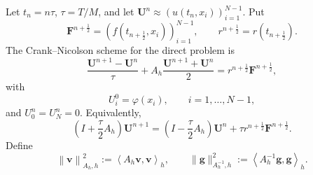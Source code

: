 \documentclass[reqno]{amsart}
\newcommand{\Ah}{A_h}
\newcommand{\ip}[2]{\left\langle #1,#2\right\rangle_h}
\newcommand{\normAh}[1]{\left\|#1\right\|_{A_h,h}}
\begin{document}
Let $t_n=n\tau$, $\tau=T/M$, and let
$\mathbf U^n\approx (u(t_n,x_i))_{i=1}^{N-1}$. Put
\[
 \mathbf F^{n+\frac12}=(f(t_{n+\frac12},x_i))_{i=1}^{N-1},
 \qquad r^{n+\frac12}=r(t_{n+\frac12}).
\]
The Crank--Nicolson scheme for the direct problem is
\begin{equation}\label{fds_full}
 \frac{\mathbf U^{n+1}-\mathbf U^n}{\tau}
 +\Ah\frac{\mathbf U^{n+1}+\mathbf U^n}{2}
 =r^{n+\frac12}\mathbf F^{n+\frac12},
\end{equation}
with
\begin{equation}\label{fds_ic}
 U_i^0=\varphi(x_i),\qquad i=1,\ldots,N-1,
\end{equation}
and $U_0^n=U_N^n=0$. Equivalently,
\begin{equation}\label{eq:CN-matrix}
 \left(I+\frac\tau2\Ah\right)\mathbf U^{n+1}
 =\left(I-\frac\tau2\Ah\right)\mathbf U^n
 +\tau r^{n+\frac12}\mathbf F^{n+\frac12}.
\end{equation}
Define
\begin{equation}\label{eq:A-norm}
 \normAh{\mathbf v}^2:=\ip{\Ah\mathbf v}{\mathbf v},
 \qquad
 \|\mathbf g\|_{A_h^{-1},h}^2:=\ip{\Ah^{-1}\mathbf g}{\mathbf g}.
\end{equation}
\end{document}
